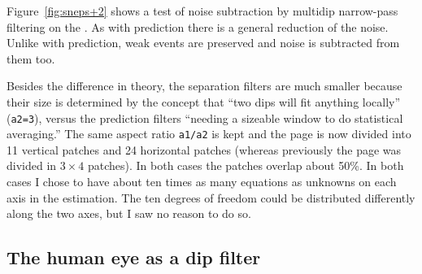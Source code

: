 \par
Figure~\ref{fig:sneps+2} shows a test of noise subtraction
by multidip narrow-pass filtering
on the .
As with prediction there is a general reduction of the noise.
Unlike with prediction, weak events are preserved
and noise is subtracted from them too.



\par
Besides the difference in theory,
the separation filters are much smaller
because their size is determined by
the concept that ``two dips will fit anything locally''
({\tt a2=3}),
versus the prediction filters
``needing a sizeable window to do statistical averaging.''
The same aspect ratio {\tt a1/a2} is kept and
the page is now divided into
11 vertical patches and 24 horizontal patches
(whereas previously the page was divided in $3\times 4$ patches).
In both cases the patches overlap about 50\%.
In both cases I chose to have about ten times as many equations
as unknowns on each axis in the estimation.
The ten degrees of freedom could be distributed differently
along the two axes, but I saw no reason to do so.

\subsection{The human eye as a dip filter}

